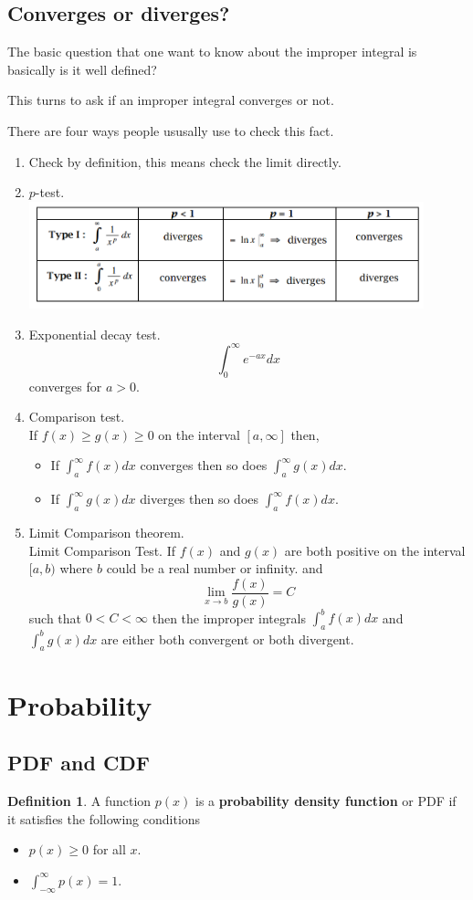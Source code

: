 \documentclass[12pt]{article}
\theoremstyle{definition}
\theoremstyle{definition}
\newtheorem{definition}{Definition}[section]
\theoremstyle{remark}
\theoremstyle{definition}
\theoremstyle{definition}
\theoremstyle{definition}
\begin{document}
\subsection{Converges or diverges?}
The basic question that one want to know about the improper integral is basically is it well defined?

This turns to ask if an improper integral converges or not.

There are four ways people ususally use to check this fact.
\begin{enumerate}
	\item Check by definition, this means check the limit directly.
	\item $p$-test.\\
	\includegraphics*[width=0.9\textwidth]{1.png}
	\item Exponential decay test. 
	\[\int^\infty_0 e^{-ax} dx\] converges for $a>0$.
	\item Comparison test.\\
	If $f(x)\geq g(x) \geq 0$ on the interval $[a,\infty]$ then,\begin{itemize}
	\item If $\int^\infty_a f(x) dx$ converges then so does $\int^\infty_a g(x) dx$.
	\item If $\int^\infty_a g(x) dx$ diverges then so does $\int^\infty_a f(x) dx$.
	\end{itemize}
	\item Limit Comparison theorem.\\
	Limit Comparison Test. If $f(x)$ and $g(x)$ are both positive  on the interval $[a,b)$ where $b$ could be a real number or infinity.
	and
	\[\lim_{x\to b}\frac{f(x)}{g(x)} = C\] such that $0 < C < \infty$
	then the improper integrals $\int^b_a f(x) dx$ and $\int^b_a g(x) dx$ are either both convergent or both divergent.

\end{enumerate}

\section{Probability}
\subsection{PDF and CDF}
\begin{definition}
A function $p(x)$ is a \textbf{probability density function} or PDF if it satisfies the following conditions
\begin{itemize}
\item $p(x) \geq 0$ for all $x$.
\item $\int_{-\infty}^\infty p(x) = 1.$
\end{itemize}
\end{definition}
\end{document}
